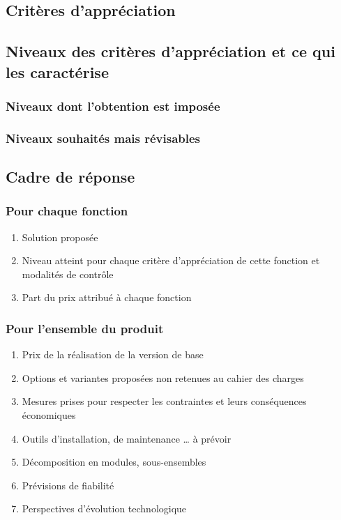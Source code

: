 \documentclass[10pt,a4paper]{article}
\begin{document}
\subsection{Critères d’appréciation}

\subsection{Niveaux des critères d’appréciation et ce qui les caractérise}
\subsubsection{Niveaux dont l’obtention est imposée}
\subsubsection{Niveaux souhaités mais révisables}

\subsection{Cadre de réponse}

\subsubsection{Pour chaque fonction}
\begin{enumerate}
\item{Solution proposée}
\item{Niveau atteint pour chaque critère d’appréciation de cette fonction et modalités de contrôle}
\item{Part du prix attribué à chaque fonction}
\end{enumerate}

\subsubsection{Pour l’ensemble du produit}
\begin{enumerate}
\item{Prix de la réalisation de la version de base}
\item{Options et variantes proposées non retenues au cahier des charges}
\item{Mesures prises pour respecter les contraintes et leurs conséquences économiques}
\item{Outils d’installation, de maintenance … à prévoir}
\item{Décomposition en modules, sous-ensembles}
\item{Prévisions de fiabilité}
\item{ Perspectives d’évolution technologique}
\end{enumerate}
\end{document}
